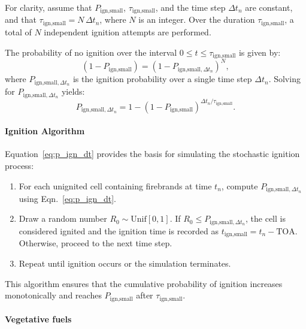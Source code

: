 For clarity, assume that $P_{\text{ign,small}}$, $\tau_{\text{ign,small}}$, and the time step $\Delta t_n$ are constant, and that $\tau_{\text{ign,small}} = N \, \Delta t_n$, where $N$ is an integer. Over the duration $\tau_{\text{ign,small}}$, a total of $N$ independent ignition attempts are performed.

The probability of no ignition over the interval $0 \le t \le \tau_{\text{ign,small}}$ is given by:
\begin{equation}\label{eq:p_no_ignition}
(1 - P_{\text{ign,small}}) = (1 - P_{\text{ign,small},\Delta t_n})^N,
\end{equation}
where $P_{\text{ign,small},\Delta t_n}$ is the ignition probability over a single time step $\Delta t_n$. Solving for $P_{\text{ign,small},\Delta t_n}$ yields:
\begin{equation}\label{eq:p_ign_dt}
P_{\text{ign,small},\Delta t_n} = 1 - (1 - P_{\text{ign,small}})^{\Delta t_n / \tau_{\text{ign,small}}}.
\end{equation}

\paragraph{Ignition Algorithm}

Equation~\ref{eq:p_ign_dt} provides the basis for simulating the stochastic ignition process:

\begin{enumerate}
\item For each unignited cell containing firebrands at time $t_n$, compute $P_{\text{ign,small},\Delta t_n}$ using Eqn.~\ref{eq:p_ign_dt}.
\item Draw a random number $R_0 \sim \text{Unif}[0,1]$. If $R_0 \le P_{\text{ign,small},\Delta t_n}$, the cell is considered ignited and the ignition time is recorded as $t_{\text{ign,small}} = t_n - \mathrm{TOA}$. Otherwise, proceed to the next time step.
\item Repeat until ignition occurs or the simulation terminates.
\end{enumerate}

This algorithm ensures that the cumulative probability of ignition increases monotonically and reaches $P_{\text{ign,small}}$ after $\tau_{\text{ign,small}}$.

\paragraph{Vegetative fuels}


